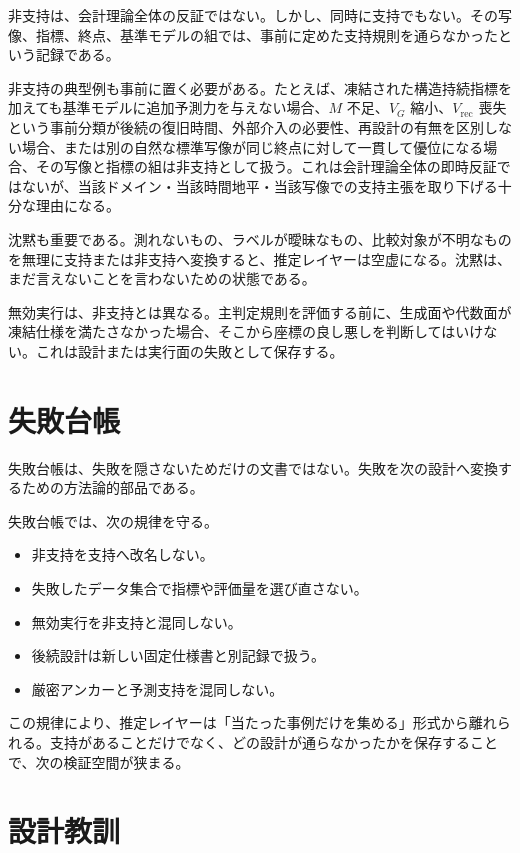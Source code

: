 \documentclass[12pt,a4paper]{article}
\begin{document}
非支持は、会計理論全体の反証ではない。しかし、同時に支持でもない。その写像、指標、終点、基準モデルの組では、事前に定めた支持規則を通らなかったという記録である。

非支持の典型例も事前に置く必要がある。たとえば、凍結された構造持続指標を加えても基準モデルに追加予測力を与えない場合、\(M\) 不足、\(V_{G}\) 縮小、\(V_{\mathrm{rec}}\) 喪失という事前分類が後続の復旧時間、外部介入の必要性、再設計の有無を区別しない場合、または別の自然な標準写像が同じ終点に対して一貫して優位になる場合、その写像と指標の組は非支持として扱う。これは会計理論全体の即時反証ではないが、当該ドメイン・当該時間地平・当該写像での支持主張を取り下げる十分な理由になる。

沈黙も重要である。測れないもの、ラベルが曖昧なもの、比較対象が不明なものを無理に支持または非支持へ変換すると、推定レイヤーは空虚になる。沈黙は、まだ言えないことを言わないための状態である。

無効実行は、非支持とは異なる。主判定規則を評価する前に、生成面や代数面が凍結仕様を満たさなかった場合、そこから座標の良し悪しを判断してはいけない。これは設計または実行面の失敗として保存する。

\section{失敗台帳}\label{ux5931ux6557ux53f0ux5e33}

失敗台帳は、失敗を隠さないためだけの文書ではない。失敗を次の設計へ変換するための方法論的部品である。

失敗台帳では、次の規律を守る。

\begin{itemize}
\tightlist
\item
  非支持を支持へ改名しない。
\item
  失敗したデータ集合で指標や評価量を選び直さない。
\item
  無効実行を非支持と混同しない。
\item
  後続設計は新しい固定仕様書と別記録で扱う。
\item
  厳密アンカーと予測支持を混同しない。
\end{itemize}

この規律により、推定レイヤーは「当たった事例だけを集める」形式から離れられる。支持があることだけでなく、どの設計が通らなかったかを保存することで、次の検証空間が狭まる。

\section{設計教訓}\label{ux8a2dux8a08ux6559ux8a13}
\end{document}

